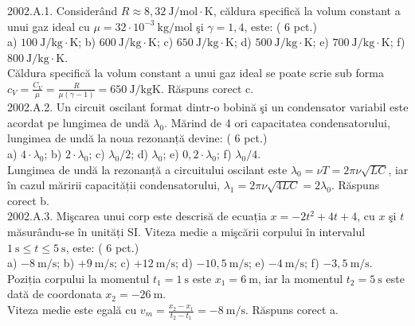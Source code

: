 
2002.A.1. Considerând $R \approx 8,32 \mathrm{~J} / \mathrm{mol} \cdot \mathrm{K}$, căldura specifică la volum constant a unui gaz ideal cu $\mu=32 \cdot 10^{-3} \mathrm{~kg} / \mathrm{mol}$ şi $\gamma=1,4$, este: ( 6 pct.)\\ a) $100 \mathrm{~J} / \mathrm{kg} \cdot \mathrm{K}$; b) $600 \mathrm{~J} / \mathrm{kg} \cdot \mathrm{K}$; c) $650 \mathrm{~J} / \mathrm{kg} \cdot \mathrm{K}$; d) $500 \mathrm{~J} / \mathrm{kg} \cdot \mathrm{K}$; e) $700 \mathrm{~J} / \mathrm{kg} \cdot \mathrm{K}$; f) $800 \mathrm{~J} / \mathrm{kg} \cdot \mathrm{K}$.\\ Căldura specifică la volum constant a unui gaz ideal se poate scrie sub forma $c_{V}=\frac{C_{V}}{\mu}=\frac{R}{\mu(\gamma-1)}=650 \mathrm{~J} / \mathrm{kgK}$. Răspuns corect c.\\

2002.A.2. Un circuit oscilant format dintr-o bobină şi un condensator variabil este acordat pe lungimea de undă $\lambda_{0}$. Mărind de 4 ori capacitatea condensatorului, lungimea de undă la noua rezonanță devine: ( 6 pct.)\\ a) $4 \cdot \lambda_{0}$; b) $2 \cdot \lambda_{0}$; c) $\lambda_{0} / 2$; d) $\lambda_{0}$; e) $0,2 \cdot \lambda_{0}$; f) $\lambda_{0} / 4$.\\ Lungimea de undă la rezonanță a circuitului oscilant este $\lambda_{0}=\nu T=2 \pi \nu \sqrt{L C}$, iar în cazul măririi capacității condensatorului, $\lambda_{1}=2 \pi \nu \sqrt{4 L C}=2 \lambda_{0}$. Răspuns corect b.\\

2002.A.3. Mişcarea unui corp este descrisă de ecuația $x=-2 t^{2}+4 t+4$, cu $x$ şi $t$ măsurându-se în unități SI. Viteza medie a mişcării corpului în intervalul $1 \mathrm{~s} \leq t \leq 5 \mathrm{~s}$, este: ( 6 pct.)\\ a) $-8 \mathrm{~m} / \mathrm{s}$; b) $+9 \mathrm{~m} / \mathrm{s}$; c) $+12 \mathrm{~m} / \mathrm{s}$; d) $-10,5 \mathrm{~m} / \mathrm{s}$; e) $-4 \mathrm{~m} / \mathrm{s}$; f) $-3,5 \mathrm{~m} / \mathrm{s}$.\\ Poziția corpului la momentul $t_{1}=1 \mathrm{~s}$ este $x_{1}=6 \mathrm{~m}$, iar la momentul $t_{2}=5 \mathrm{~s}$ este dată de coordonata $x_{2}=-26 \mathrm{~m}$.\\ Viteza medie este egală cu $v_{m}=\frac{x_{2}-x_{1}}{t_{2}-t_{1}}=-8 \mathrm{~m} / \mathrm{s}$. Răspuns corect a.\\

